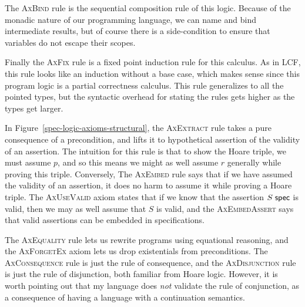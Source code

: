 The \textsc{AxBind} rule is the sequential composition rule of this
logic.  Because of the monadic nature of our programming language, we
can name and bind intermediate results, but of course there is a side-condition
to ensure that variables do not escape their scopes. 

Finally the \textsc{AxFix} rule is a fixed point induction rule for
this calculus. As in LCF, this rule looks like an induction without a
base case, which makes sense since this program logic is a partial
correctness calculus. This rule generalizes to all the pointed types,
but the syntactic overhead for stating the rules gets higher as the
types get larger.

In Figure~\ref{spec-logic-axioms-structural}, the \textsc{AxExtract}
rule takes a pure consequence of a precondition, and lifts it to
hypothetical assertion of the validity of an assertion. The intuition
for this rule is that to show the Hoare triple, we must assume $p$,
and so this means we might as well assume $r$ generally while proving
this triple. Conversely, The \textsc{AxEmbed} rule says that if we
have assumed the validity of an assertion, it does no harm to assume
it while proving a Hoare triple. The \textsc{AxUseValid} axiom states
that if we know that the assertion ${S}\;\mathsf{spec}$ is valid, then we
may as well assume that $S$ is valid, and the \textsc{AxEmbedAssert}
says that valid assertions can be embedded in specifications. 

The \textsc{AxEquality} rule lets us rewrite programs using equational
reasoning, and the \textsc{AxForgetEx} axiom lets us drop existentials
from preconditions. The \textsc{AxConsequence} rule is just the rule
of consequence, and the \textsc{AxDisjunction} rule is just the rule
of disjunction, both familiar from Hoare logic. However, it is worth
pointing out that my language does \emph{not} validate the rule of
conjunction, as a consequence of having a language with a continuation
semantics.

